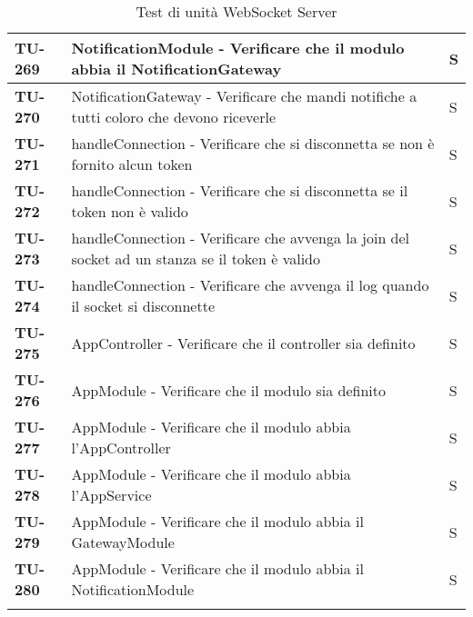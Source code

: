 \begin{longtable}{|>{\centering\arraybackslash}p{2cm}|p{15cm}|p{1cm}|}
  \hline
  \rowcolor{gray!10}
  \textbf{TU-269} & NotificationModule - Verificare che il modulo abbia il NotificationGateway & S \\
  \hline
  \rowcolor{gray!10}
  \textbf{TU-270} & NotificationGateway - Verificare che mandi notifiche a tutti coloro che devono riceverle & S \\
  \hline
  \rowcolor{gray!10}
  \textbf{TU-271} & handleConnection - Verificare che si disconnetta se non è fornito alcun token & S \\
  \hline
  \rowcolor{gray!10}
  \textbf{TU-272} & handleConnection - Verificare che si disconnetta se il  token non è valido & S \\
  \hline
  \rowcolor{gray!10}
  \textbf{TU-273} & handleConnection - Verificare che avvenga la join del socket ad un stanza  se il token è valido & S \\
  \hline
  \rowcolor{gray!10}
  \textbf{TU-274} & handleConnection - Verificare che avvenga il log quando il socket si disconnette & S \\
  \hline
  \rowcolor{gray!10}
  \textbf{TU-275} & AppController - Verificare che il controller sia definito & S \\
  \hline
  \rowcolor{gray!10}
  \textbf{TU-276} & AppModule - Verificare che il modulo sia definito & S \\
  \hline
  \rowcolor{gray!10}
  \textbf{TU-277} & AppModule - Verificare che il modulo abbia l'AppController & S \\
  \hline
  \rowcolor{gray!10}
  \textbf{TU-278} & AppModule - Verificare che il modulo abbia l'AppService & S \\
  \hline
  \rowcolor{gray!10}
  \textbf{TU-279} & AppModule - Verificare che il modulo abbia il GatewayModule & S \\
  \hline
  \rowcolor{gray!10}
  \textbf{TU-280} & AppModule - Verificare che il modulo abbia il NotificationModule & S \\
  \hline

    \caption{Test di unità WebSocket Server} 
    \label{tab:test_unita}
\end{longtable}



